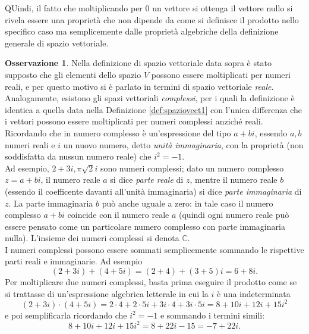 \documentclass{book}
\theoremstyle{definition}
\newtheorem{oss}{Osservazione}[section]
\theoremstyle{plain}
\begin{document}
QUindi, il fatto che moltiplicando per 0 un vettore si ottenga il vettore nullo si rivela essere una proprietà che non dipende da come si definisce il prodotto nello specifico caso ma semplicemente dalle proprietà algebriche della definizione generale di spazio vettoriale.
\begin{oss}
  \label{oss:spaziovect2}
  Nella definizione di spazio vettoriale data sopra è stato supposto che gli elementi dello spazio $V$ possono essere moltiplicati per numeri reali, e per questo motivo si è parlato in termini di spazio vettoriale \textit{reale}.\\
  Analogamente, esistono gli spazi vettoriali \textit{complessi}, per i quali la definizione è identica a quella data nella Definizione \ref{def:spaziovect1} con l'unica differenza che i vettori possono essere moltiplicati per numeri complessi anziché reali.\\
  Ricordando che in numero complesso è un'espressione del tipo $a+bi$, essendo $a,b$ numeri reali e $i$ un nuovo numero, detto \textit{unità immaginaria}, con la proprietà (non soddisfatta da nussun numero reale) che $i^2=-1$.\\
  Ad esempio, $2+3i,\pi\sqrt{2}i$ sono numeri complessi; dato un numero complesso $z=a+bi$, il numero reale $a$ si dice \textit{parte reale} di $z$, mentre il numero reale $b$ (essendo il coefficente davanti all'unità immaginaria) si dice \textit{parte immaginaria} di $z$. La parte immaginaria $b$ può anche uguale a zero: in tale caso il numero complesso $a+bi$ coincide con il numero reale $a$ (quindi ogni numero reale può essere pensato come un particolare numero complesso con parte immaginaria nulla). L'insieme dei numeri complessi si denota $\mathds{C}$.\\
  I numeri complessi possono essere sommati semplicemente sommando le rispettive parti reali e immaginarie. Ad esempio
  \begin{equation*}
    (2+3i)+(4+5i)=(2+4)+(3+5)i=6+8i.
  \end{equation*}
  Per moltiplicare due numeri complessi, basta prima eseguire il prodotto come se si trattasse di un'espressione algebrica letterale in cui la $i$ è una indeterminata
  \begin{equation*}
    (2+3i)\cdot (4+5i)=2\cdot 4+2\cdot 5i+3i\cdot 4+3i\cdot 5i= 8+10i+12i+15i^2
  \end{equation*}
  e poi semplificarla ricordando che $i^2=-1$ e sommando i termini simili:
  \begin{equation*}
    8+10i+12i+15i^2=8+22i-15=-7+22i.

\end{equation*}
\end{oss}
\end{document}
